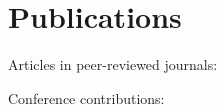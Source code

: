 \chapter*{Publications}

\noindent
Articles in peer-reviewed journals:
\begin{refsection}[ownpubs]
  \small%
  \nocite{*}
  \printbibliography[heading=none,type=article]
\end{refsection}

\noindent
Conference contributions:
\begin{refsection}[ownpubs]
  \small%
  \nocite{*}
  \printbibliography[heading=none,type=inproceedings]
\end{refsection}
